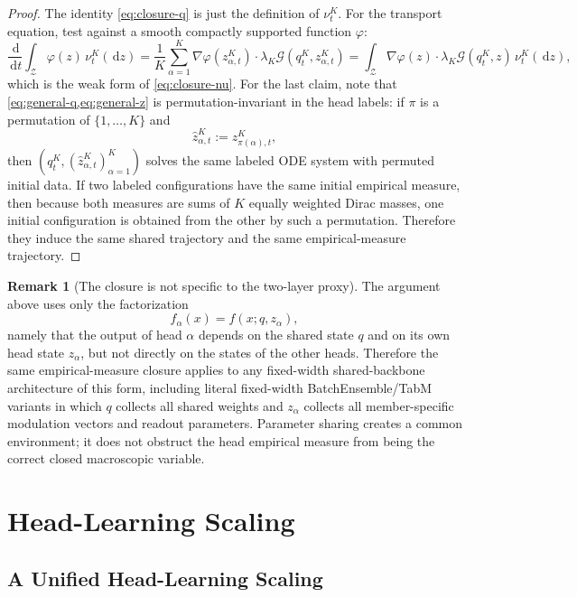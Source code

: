 \documentclass{article}
\theoremstyle{definition}
\newtheorem{remark}[theorem]{Remark}
\newcommand{\dd}{\,\mathrm{d}}
\begin{document}
\begin{proof}
The identity \eqref{eq:closure-q} is just the definition of $\nu_t^K$. For the transport equation, test against a smooth compactly supported function $\varphi$:
\[
  \frac{\dd}{\dd t}\int_{\mathcal Z}\varphi(z)\,\nu_t^K(\dd z)
  =
  \frac1K\sum_{\alpha=1}^K
  \nabla\varphi(z_{\alpha,t}^K)\cdot \lambda_K\mathcal G(q_t^K,z_{\alpha,t}^K)
  =
  \int_{\mathcal Z}
  \nabla\varphi(z)\cdot \lambda_K\mathcal G(q_t^K,z)\,\nu_t^K(\dd z),
\]
which is the weak form of \eqref{eq:closure-nu}. For the last claim, note that \cref{eq:general-q,eq:general-z} is permutation-invariant in the head labels: if $\pi$ is a permutation of $\{1,\dots,K\}$ and
\[
  \widehat z_{\alpha,t}^K:=z_{\pi(\alpha),t}^K,
\]
then $(q_t^K,(\widehat z_{\alpha,t}^K)_{\alpha=1}^K)$ solves the same labeled ODE system with permuted initial data. If two labeled configurations have the same initial empirical measure, then because both measures are sums of $K$ equally weighted Dirac masses, one initial configuration is obtained from the other by such a permutation. Therefore they induce the same shared trajectory and the same empirical-measure trajectory.
\end{proof}

\begin{remark}[The closure is not specific to the two-layer proxy]
\label{rem:abstract-closure}
The argument above uses only the factorization
\[
  f_\alpha(x)=f(x;q,z_\alpha),
\]
namely that the output of head $\alpha$ depends on the shared state $q$ and on its own head state $z_\alpha$, but not directly on the states of the other heads. Therefore the same empirical-measure closure applies to any fixed-width shared-backbone architecture of this form, including literal fixed-width BatchEnsemble/TabM variants in which $q$ collects all shared weights and $z_\alpha$ collects all member-specific modulation vectors and readout parameters. Parameter sharing creates a common environment; it does not obstruct the head empirical measure from being the correct closed macroscopic variable.
\end{remark}

\section{Head-Learning Scaling}
\label{sec:scalings}
\subsection{A Unified Head-Learning Scaling}
\end{document}
